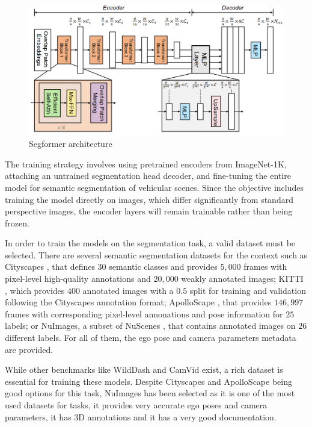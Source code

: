 \begin{figure}[h!]
    \centering
    \includegraphics[width=\linewidth]{images/methodology/segformer_architecture.png}
    \caption{Segformer architecture}
    \label{fig:segformer_architecture}
\end{figure}

The training strategy involves using pretrained encoders from ImageNet-1K, attaching an untrained segmentation head decoder, and fine-tuning the entire model for semantic segmentation of vehicular scenes. Since the objective includes training the model directly on  images, which differ significantly from standard perspective images, the encoder layers will remain trainable rather than being frozen.

 \label{sec:BEVDataset}
In order to train the models on the segmentation task, a valid dataset must be selected. There are several semantic segmentation datasets for the  context such as Cityscapes \cite{Cityscapes}, that defines $30$ semantic classes and provides $5,000$ frames with pixel-level high-quality annotations and $20,000$ weakly annotated images; KITTI \cite{KITTI}, which provides $400$ annotated images with a $0.5$ split for training and validation following the Cityscapes annotation format; ApolloScape \cite{ApolloScape}, that provides $146,997$ frames with corresponding pixel-level annonations and pose information for $25$ labels; or NuImages, a subset of NuScenes \cite{nuscenes}, that contains annotated images on $26$ different labels. For all of them, the ego pose and camera parameters metadata are provided. 

While other benchmarks like WildDash \cite{WildDash} and CamVid \cite{CamVid} exist, a rich dataset is essential for training these models. Despite Cityscapes and ApolloScape being good options for this task, NuImages has been selected as it is one of the most used datasets for  tasks, it provides very accurate ego poses and camera parameters, it has 3D annotations and it has a very good documentation.

